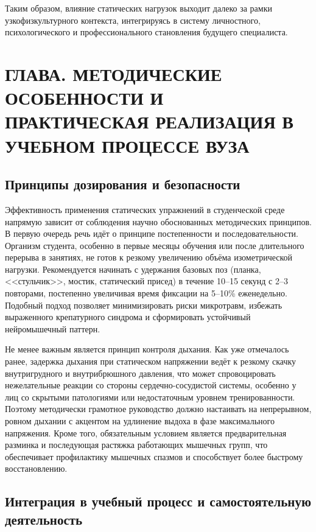 \documentclass[oneside,a4paper,14pt]{extarticle}
\begin{document}
Таким образом, влияние статических нагрузок выходит далеко за рамки узкофизкультурного контекста, интегрируясь в систему личностного, психологического и профессионального становления будущего специалиста.

\section{ГЛАВА. МЕТОДИЧЕСКИЕ ОСОБЕННОСТИ И ПРАКТИЧЕСКАЯ РЕАЛИЗАЦИЯ В УЧЕБНОМ ПРОЦЕССЕ ВУЗА}

\subsection{Принципы дозирования и безопасности}

Эффективность применения статических упражнений в студенческой среде напрямую зависит от соблюдения научно обоснованных методических принципов. В первую очередь речь идёт о принципе постепенности и последовательности. Организм студента, особенно в первые месяцы обучения или после длительного перерыва в занятиях, не готов к резкому увеличению объёма изометрической нагрузки. Рекомендуется начинать с удержания базовых поз (планка, <<стульчик>>, мостик, статический присед) в течение 10--15 секунд с 2--3 повторами, постепенно увеличивая время фиксации на 5--10\% еженедельно. Подобный подход позволяет минимизировать риски микротравм, избежать выраженного крепатурного синдрома и сформировать устойчивый нейромышечный паттерн.

Не менее важным является принцип контроля дыхания. Как уже отмечалось ранее, задержка дыхания при статическом напряжении ведёт к резкому скачку внутригрудного и внутрибрюшного давления, что может спровоцировать нежелательные реакции со стороны сердечно-сосудистой системы, особенно у лиц со скрытыми патологиями или недостаточным уровнем тренированности. Поэтому методически грамотное руководство должно настаивать на непрерывном, ровном дыхании с акцентом на удлинение выдоха в фазе максимального напряжения. Кроме того, обязательным условием является предварительная разминка и последующая растяжка работающих мышечных групп, что обеспечивает профилактику мышечных спазмов и способствует более быстрому восстановлению.

\subsection{Интеграция в учебный процесс и самостоятельную деятельность}
\end{document}
